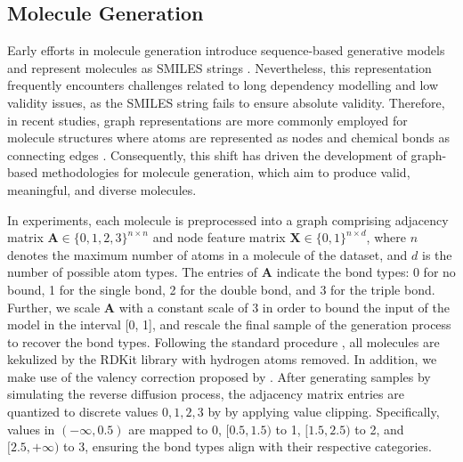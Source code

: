 

\subsection{Molecule Generation}
\label{app:mol}


Early efforts in molecule generation introduce sequence-based generative models and represent molecules as SMILES strings \cite{SMILES-ICML2017}. 
%
Nevertheless, this representation frequently encounters challenges related to long dependency modelling and low validity issues, as the SMILES string fails to ensure absolute validity. 
Therefore, in recent studies, graph representations are more commonly employed for molecule structures where atoms are represented as nodes and chemical bonds as connecting edges \cite{GDSS+ICML2022}.
Consequently, this shift has driven the development of graph-based methodologies for molecule generation, which aim to produce valid, meaningful, and diverse molecules.


In experiments, each molecule is preprocessed into a graph comprising adjacency matrix $\bm{A}\in \{0,1,2,3\}^{n\times n}$ and node feature matrix $\bm{X}\in \{0,1\}^{n\times d}$, where $n$ denotes the maximum number of atoms in a molecule of the dataset, and $d$ is the number of possible atom types. The entries of $\bm{A}$ indicate the bond types: 0 for no bound, 1 for the single bond, 2 for the double bond, and 3 for the triple bond. 
Further, we scale $\bm{A}$ with a constant scale of 3 in order to bound the input of the model in the interval [0, 1], and rescale the final sample of the generation process to recover the bond types.
%
Following the standard procedure \cite{GraphAF-ICLR2020, GraphDF-ICML2021}, all molecules are kekulized by the RDKit library \cite{Rdkit2016} with hydrogen atoms removed. In addition, we make use of the valency correction proposed by \citet{Moflow-SIGKDD2020}. 
After generating samples by simulating the reverse diffusion process,  the adjacency matrix entries are quantized to discrete values ${0, 1, 2, 3}$ by by applying value clipping. Specifically, values in $(-\infty, 0.5)$ are mapped to 0, $[0.5, 1.5)$ to 1, $[1.5, 2.5)$ to 2, and $[2.5, +\infty)$ to 3, ensuring the bond types align with their respective categories.





